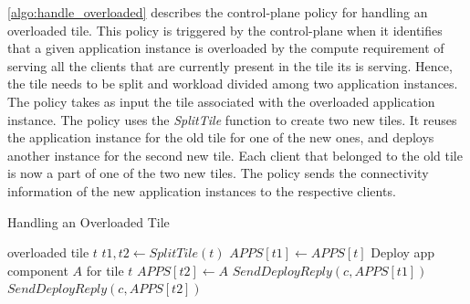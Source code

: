 \cref{algo:handle_overloaded} describes the control-plane policy for handling an overloaded tile. This policy is triggered by the control-plane when it identifies that a given application instance is overloaded by the compute requirement of serving all the clients that are currently present in the tile its is serving. Hence, the tile needs to be split and workload divided among two application instances. The policy takes as input the tile associated with the overloaded application instance. The policy uses the \textit{SplitTile} function to create two new tiles. It reuses the application instance for the old tile for one of the new ones, and deploys another instance for the second new tile. Each client that belonged to the old tile is now a part of one of the two new tiles. The policy sends the connectivity information of the new application instances to the respective clients. 
\begin{algorithm}
\caption{Handling an Overloaded Tile}
\begin{algorithmic}
\Require overloaded tile $t$
\State $t1, t2 \gets SplitTile \left( t \right)$
\State $APPS \left[ t1 \right] \gets APPS \left[ t \right]$
\State Deploy app component $A$ for tile $t$
\State $APPS  \left[ t2 \right] \gets A$
    \State $SendDeployReply \left(c, APPS \left[ t1 \right] \right)$
\EndFor
{}
    \State $SendDeployReply \left(c, APPS \left[ t2 \right] \right)$
\EndFor
\end{algorithmic}
\label{algo:handle_overloaded}
\end{algorithm}

